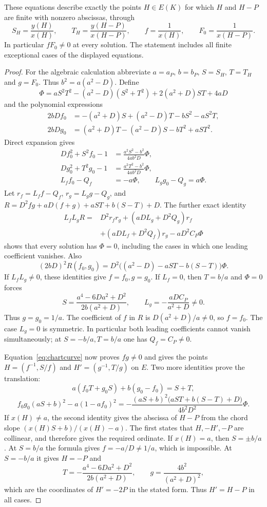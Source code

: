 \documentclass[11pt,a4paper]{article}
\begin{document}
\begin{lemma}\label{lem:commonchart}
These equations describe exactly the points $H\in E(K)$ for which
$H$ and $H-P$ are finite with nonzero abscissas, through
\[
 S_H=\frac{y(H)}{x(H)},\qquad T_H=\frac{y(H-P)}{x(H-P)},\qquad
 f=\frac1{x(H)},\qquad F_0=\frac1{x(H-P)}.
\]
In particular $fF_0\ne0$ at every solution. The statement includes
all finite exceptional cases of the displayed equations.
\end{lemma}
\begin{proof}
For the algebraic calculation abbreviate $a=a_P$, $b=b_P$, $S=S_H$, $T=T_H$
and $g=F_0$. Thus $b^2=a(a^2-D)$. Define
\[
 \Phi=aS^2T^2-(a^2-D)(S^2+T^2)+2(a^2+D)ST+4aD
\]
and the polynomial expressions
\begin{align*}
 2bDf_0&=-(a^2+D)S+(a^2-D)T-bS^2-aS^2T,\\
 2bDg_0&=(a^2+D)T-(a^2-D)S-bT^2+aST^2.
\end{align*}
Direct expansion gives
\begin{align}
 Df_0^2+S^2f_0-1
   &=\frac{a^2S^2-b^2}{4ab^2D}\Phi,\label{eq:chartcurve}\\
 Dg_0^2+T^2g_0-1
   &=\frac{a^2T^2-b^2}{4ab^2D}\Phi,\nonumber\\
 L_ff_0-Q_f&=-a\Phi,\qquad L_gg_0-Q_g=a\Phi.\nonumber
\end{align}
Let $r_f=L_ff-Q_f$, $r_g=L_gg-Q_g$, and
$R=D^2fg+aD(f+g)+aST+b(S-T)+D$. The further exact identity
\begin{equation}\label{eq:chartmaster}
\begin{split}
 L_fL_gR={}&D^2r_fr_g+(aDL_g+D^2Q_g)r_f\\
          &+(aDL_f+D^2Q_f)r_g-aD^2C_P\Phi
\end{split}
\end{equation}
shows that every solution has $\Phi=0$, including the cases in which
one leading coefficient vanishes. Also
\[
 (2bD)^2R(f_0,g_0)=
 D^2\bigl((a^2-D)-aST-b(S-T)\bigr)\Phi.
\]
If $L_fL_g\ne0$, these identities give $f=f_0,g=g_0$.
If $L_f=0$, then $T=b/a$ and $\Phi=0$ forces
\[
 S=\frac{a^4-6Da^2+D^2}{2b(a^2+D)},\qquad
 L_g=-\frac{aDC_P}{a^2+D}\ne0.
\]
Thus $g=g_0=1/a$. The coefficient of $f$ in $R$ is
$D(a^2+D)/a\ne0$, so $f=f_0$. The case $L_g=0$ is symmetric.
In particular both leading coefficients cannot vanish simultaneously;
at $S=-b/a,T=b/a$ one has $Q_f=C_P\ne0$.

Equation~\eqref{eq:chartcurve} now proves $fg\ne0$ and gives the
points $H=(f^{-1},S/f)$ and $H'=(g^{-1},T/g)$ on $E$.
Two more identities prove the translation:
\[
 a(f_0T+g_0S)+b(g_0-f_0)=S+T,
\]
\[
 f_0g_0(aS+b)^2-a(1-af_0)^2
 =-\frac{(aS+b)^2\bigl(aST+b(S-T)+D\bigr)}{4b^2D^2}\Phi.
\]
If $x(H)\ne a$, the second identity gives the abscissa of
$H-P$ from the chord slope $(x(H)S+b)/(x(H)-a)$.
The first states that $H,-H',-P$ are collinear, and therefore gives
the required ordinate. If $x(H)=a$, then $S=\pm b/a$.
At $S=b/a$ the formula gives $f=-a/D\ne1/a$, which is impossible.
At $S=-b/a$ it gives $H=-P$ and
\[
 T=-\frac{a^4-6Da^2+D^2}{2b(a^2+D)},\qquad
 g=\frac{4b^2}{(a^2+D)^2},
\]
which are the coordinates of $H'=-2P$ in the stated form.
Thus $H'=H-P$ in all cases.


\end{proof}
\end{document}
